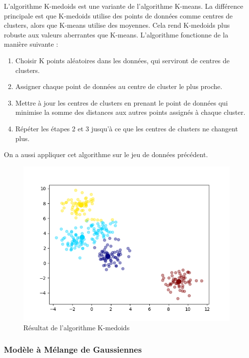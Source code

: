 \documentclass[french,a4paper,18pt]{article}
\begin{document}
L'algorithme K-medoids est une variante de l'algorithme K-means. 
La différence principale est que K-medoids utilise des points de données comme centres de clusters, alors que K-means utilise des moyennes.
Cela rend K-medoids plus robuste aux valeurs aberrantes que K-means.
L'algorithme fonctionne de la manière suivante :
\begin{enumerate}
    \item Choisir K points aléatoires dans les données, qui serviront de centres de clusters.
    \item Assigner chaque point de données au centre de cluster le plus proche.
    \item Mettre à jour les centres de clusters en prenant le point de données qui minimise la somme des distances aux autres points assignés à chaque cluster.
    \item Répéter les étapes 2 et 3 jusqu'à ce que les centres de clusters ne changent plus.
\end{enumerate}

On a aussi appliquer cet algorithme sur le jeu de données précédent.
\begin{figure}[h!]
    \centering
    \includegraphics[scale=0.5]{../images/short_simulation_kmedoids.png}
    \caption{Résultat de l'algorithme K-medoids}\label{fig:short_simulation_kmedoids}
\end{figure}

\subsubsection{Modèle à Mélange de Gaussiennes}
\end{document}
